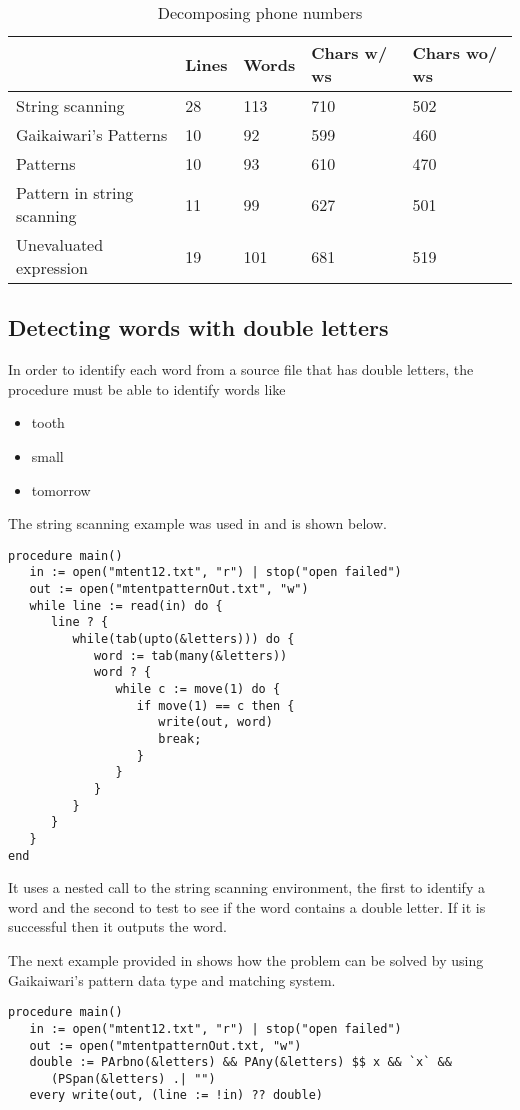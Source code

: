 \documentclass{article}
\begin{document}
\begin{table}[ht]
	\caption{Decomposing phone numbers}
	\centering
	\begin{tabular}{|l|l|l|l|l|}
		\hline\hline
		 & Lines & Words & Chars w/ ws & Chars wo/ ws\\
		\hline
		String scanning & 28 & 113 & 710 & 502 \\
		Gaikaiwari's Patterns & 10 & 92 & 599 & 460 \\
		Patterns & 10 & 93 & 610 & 470 \\
		Pattern in string scanning & 11 & 99 & 627 & 501 \\
		Unevaluated expression & 19 & 101 & 681 & 519 \\
		\hline
	\end{tabular}
\end{table}

\subsection{Detecting words with double letters}
In order to identify each word from a source file that has double letters, the procedure must be able to identify words like
\begin{itemize}
\item tooth
\item small
\item tomorrow
\end{itemize}

The string scanning example was used in\cite{Gaikaiwari2005} and is shown below.
\begin{verbatim}
procedure main()
   in := open("mtent12.txt", "r") | stop("open failed")
   out := open("mtentpatternOut.txt", "w")
   while line := read(in) do {
      line ? {
         while(tab(upto(&letters))) do {
            word := tab(many(&letters))
            word ? {
               while c := move(1) do {
                  if move(1) == c then {
                     write(out, word)
                     break;
                  }
               }
            }
         }
      }
   }
end
\end{verbatim}
It uses a nested call to the string scanning environment, the first to identify a word and the second to test to see if the word contains a double letter.  If it is successful then it outputs the word.

The next example provided in \cite{Gaikaiwari2005} shows how the problem can be solved by using Gaikaiwari's pattern data type and matching system.  
\begin{verbatim}
procedure main()
   in := open("mtent12.txt", "r") | stop("open failed")
   out := open("mtentpatternOut.txt, "w")
   double := PArbno(&letters) && PAny(&letters) $$ x && `x` && 
      (PSpan(&letters) .| "")
   every write(out, (line := !in) ?? double)
\end{verbatim}
\end{document}
